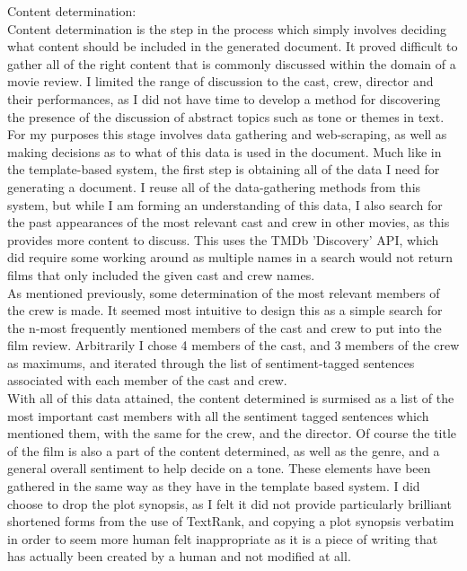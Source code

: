 Content determination:\\
Content determination is the step in the process which simply involves deciding what content should be included in the generated document.
It proved difficult to gather all of the right content that is commonly discussed within the domain of a movie review. I limited the range of discussion to the cast, crew, director and their performances, as I did not have time to develop a method for discovering the presence of the discussion of abstract topics such as tone or themes in text.\\

For my purposes this stage involves data gathering and web-scraping, as well as making decisions as to what of this data is used in the document. 
Much like in the template-based system, the first step is obtaining all of the data I need for generating a document. I reuse all of the data-gathering methods from this system, but while I am forming an understanding of this data, I also search for the past appearances of the most relevant cast and crew in other movies, as this provides more content to discuss. This uses the TMDb 'Discovery' API, which did require some working around as multiple names in a search would not return films that only included the given cast and crew names.\\

As mentioned previously, some determination of the most relevant members of the crew is made. It seemed most intuitive to design this as a simple search for the n-most frequently mentioned members of the cast and crew to put into the film review. Arbitrarily I chose 4 members of the cast, and 3 members of the crew as maximums, and iterated through the list of sentiment-tagged sentences associated with each member of the cast and crew.\\

With all of this data attained, the content determined is surmised as a list of the most important cast members with all the sentiment tagged sentences which mentioned them, with the same for the crew, and the director. Of course the title of the film is also a part of the content determined, as well as the genre, and a general overall sentiment to help decide on a tone. These elements have been gathered in the same way as they have in the template based system. I did choose to drop the plot synopsis, as I felt it did not provide particularly brilliant shortened forms from the use of TextRank, and copying a plot synopsis verbatim in order to seem more human felt inappropriate as it is a piece of writing that has actually been created by a human and not modified at all.\\

